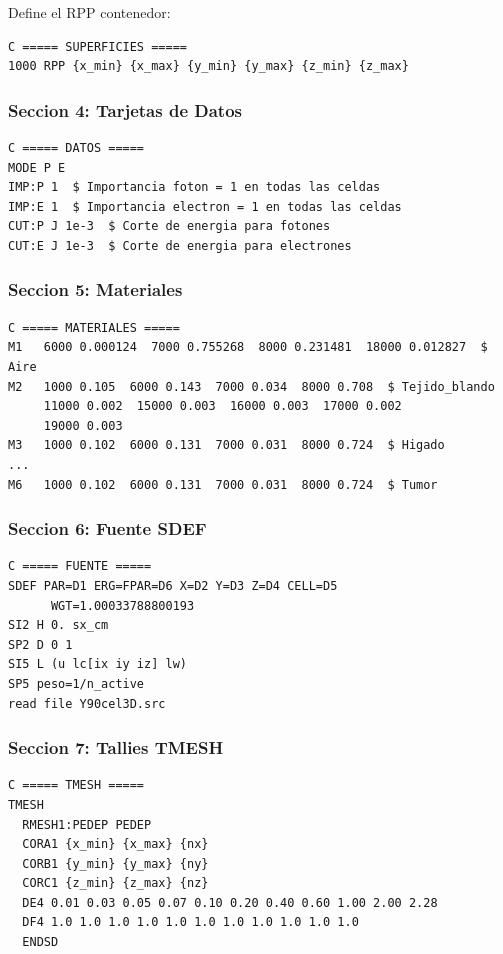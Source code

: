 \documentclass[12pt,a4paper]{article}
\begin{document}
Define el RPP contenedor:

\begin{verbatim}
C ===== SUPERFICIES =====
1000 RPP {x_min} {x_max} {y_min} {y_max} {z_min} {z_max}
\end{verbatim}

\subsubsection{Seccion 4: Tarjetas de Datos}

\begin{verbatim}
C ===== DATOS =====
MODE P E
IMP:P 1  $ Importancia foton = 1 en todas las celdas
IMP:E 1  $ Importancia electron = 1 en todas las celdas
CUT:P J 1e-3  $ Corte de energia para fotones
CUT:E J 1e-3  $ Corte de energia para electrones
\end{verbatim}

\subsubsection{Seccion 5: Materiales}

\begin{verbatim}
C ===== MATERIALES =====
M1   6000 0.000124  7000 0.755268  8000 0.231481  18000 0.012827  $ Aire
M2   1000 0.105  6000 0.143  7000 0.034  8000 0.708  $ Tejido_blando
     11000 0.002  15000 0.003  16000 0.003  17000 0.002
     19000 0.003
M3   1000 0.102  6000 0.131  7000 0.031  8000 0.724  $ Higado
...
M6   1000 0.102  6000 0.131  7000 0.031  8000 0.724  $ Tumor
\end{verbatim}

\subsubsection{Seccion 6: Fuente SDEF}

\begin{verbatim}
C ===== FUENTE =====
SDEF PAR=D1 ERG=FPAR=D6 X=D2 Y=D3 Z=D4 CELL=D5
      WGT=1.00033788800193
SI2 H 0. sx_cm
SP2 D 0 1
SI5 L (u lc[ix iy iz] lw)
SP5 peso=1/n_active
read file Y90cel3D.src
\end{verbatim}

\subsubsection{Seccion 7: Tallies TMESH}

\begin{verbatim}
C ===== TMESH =====
TMESH
  RMESH1:PEDEP PEDEP
  CORA1 {x_min} {x_max} {nx}
  CORB1 {y_min} {y_max} {ny}
  CORC1 {z_min} {z_max} {nz}
  DE4 0.01 0.03 0.05 0.07 0.10 0.20 0.40 0.60 1.00 2.00 2.28
  DF4 1.0 1.0 1.0 1.0 1.0 1.0 1.0 1.0 1.0 1.0 1.0
  ENDSD
\end{verbatim}
\end{document}
